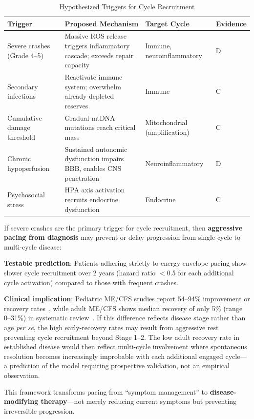 \begin{table}[htbp]
\centering
\caption{Hypothesized Triggers for Cycle Recruitment}
\label{tab:recruitment-triggers}
\begin{tabular}{p{3cm}p{5.5cm}p{2.5cm}p{2cm}}
\toprule
\textbf{Trigger} & \textbf{Proposed Mechanism} & \textbf{Target Cycle} & \textbf{Evidence} \\
\midrule
Severe crashes (Grade 4--5) & Massive ROS release triggers inflammatory cascade; exceeds repair capacity & Immune, neuroinflammatory & D \\
\addlinespace
Secondary infections & Reactivate immune system; overwhelm already-depleted reserves & Immune & C \\
\addlinespace
Cumulative damage threshold & Gradual mtDNA mutations reach critical mass & Mitochondrial (amplification) & C \\
\addlinespace
Chronic hypoperfusion & Sustained autonomic dysfunction impairs BBB, enables CNS penetration & Neuroinflammatory & D \\
\addlinespace
Psychosocial stress & HPA axis activation recruits endocrine dysfunction & Endocrine & C \\
\bottomrule
\end{tabular}
\end{table}

\begin{keypoint}
If severe crashes are the primary trigger for cycle recruitment, then \textbf{aggressive pacing from diagnosis} may prevent or delay progression from single-cycle to multi-cycle disease:

\textbf{Testable prediction}: Patients adhering strictly to energy envelope pacing show slower cycle recruitment over 2 years (hazard ratio $<$0.5 for each additional cycle activation) compared to those with frequent crashes.

\textbf{Clinical implication}: Pediatric ME/CFS studies report 54--94\% improvement or recovery rates~\cite{Rowe2017pediatric}, while adult ME/CFS shows median recovery of only 5\% (range 0--31\%) in systematic review~\cite{Cairns2005prognosis}. If this difference reflects disease stage rather than age \textit{per se}, the high early-recovery rates may result from aggressive rest preventing cycle recruitment beyond Stage 1--2. The low adult recovery rate in established disease would then reflect multi-cycle involvement where spontaneous resolution becomes increasingly improbable with each additional engaged cycle---a prediction of the model requiring prospective validation, not an empirical observation.

This framework transforms pacing from ``symptom management'' to \textbf{disease-modifying therapy}---not merely reducing current symptoms but preventing irreversible progression.
\end{keypoint}

